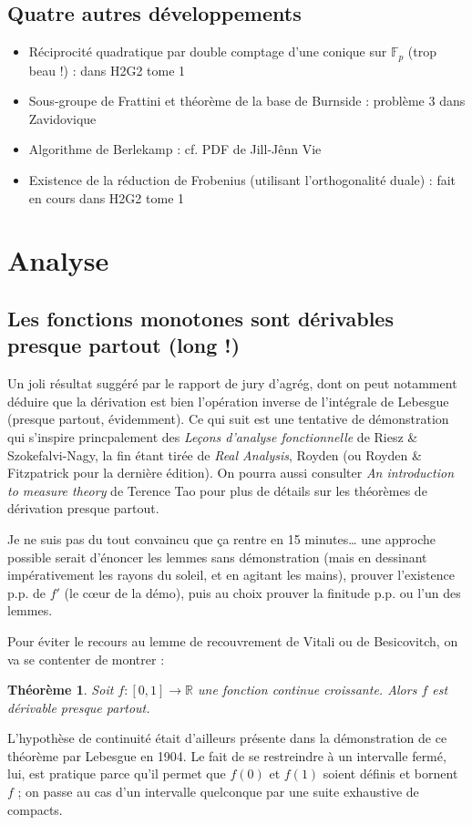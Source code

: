 \documentclass[a4paper, 11pt]{article}
\def\F{\mathbb{F}}
\def\R{\mathbb{R}}
\newtheorem*{theorem}{Théorème}
\begin{document}
\subsection{Quatre autres développements}

\begin{itemize}
\item Réciprocité quadratique par double comptage d'une conique sur $\F_p$ (trop
  beau !) : dans H2G2 tome 1
\item Sous-groupe de Frattini et théorème de la base de Burnside : problème 3
  dans Zavidovique
\item Algorithme de Berlekamp : cf. PDF de Jill-Jênn Vie
\item Existence de la réduction de Frobenius (utilisant l'orthogonalité duale) :
  fait en cours dans H2G2 tome 1
\end{itemize}


\newpage

\section{Analyse}

\subsection{Les fonctions monotones sont dérivables presque partout (long !)}

Un joli résultat suggéré par le rapport de jury d'agrég, dont on peut notamment
déduire que la dérivation est bien l'opération inverse de l'intégrale de
Lebesgue (presque partout, évidemment). Ce qui suit est une tentative de
démonstration qui s'inspire princpalement des \emph{Leçons d'analyse
  fonctionnelle} de Riesz \& Szokefalvi-Nagy, la fin étant tirée de \emph{Real
  Analysis}, Royden (ou Royden \& Fitzpatrick pour la dernière édition). On
pourra aussi consulter \emph{An introduction to measure theory} de Terence Tao
pour plus de détails sur les théorèmes de dérivation presque partout.

Je ne suis pas du tout convaincu que ça rentre en 15 minutes… une approche
possible serait d'énoncer les lemmes sans démonstration (mais en dessinant
impérativement les rayons du soleil, et en agitant les mains), prouver
l'existence p.p. de $f'$ (le cœur de la démo), puis au choix prouver la finitude
p.p. ou l'un des lemmes.

Pour éviter le recours au lemme de recouvrement de Vitali ou de Besicovitch, on
va se contenter de montrer :
\begin{theorem}
  Soit $f : [0,1] \to \R$ une fonction \textnormal{continue} croissante. Alors $f$ est
  dérivable presque partout.
\end{theorem}
L'hypothèse de continuité était d'ailleurs présente dans la démonstration de ce
théorème par Lebesgue en 1904. Le fait de se restreindre à un intervalle fermé,
lui, est pratique parce qu'il permet que $f(0)$ et $f(1)$ soient définis et
bornent $f$ ; on passe au cas d'un intervalle quelconque par une suite
exhaustive de compacts.
\end{document}
